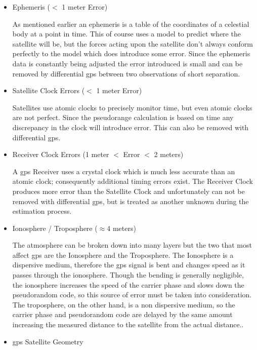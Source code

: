 \begin{itemize}
	\item Ephemeris ($<$ 1 meter Error)

As mentioned earlier an ephemeris is a table of the coordinates of a celestial body at a point in time. This of course uses a model to predict where the satellite will be, but the forces acting upon the satellite don't always conform perfectly to the model which does introduce some error.  Since the ephemeris data is constantly being adjusted the error introduced is small and can be removed by differential \ac{gps} between two observations of short separation.

	\item Satellite Clock Errors ($<$ 1 meter Error)

Satellites use atomic clocks to precisely monitor time, but even atomic clocks are not perfect.  Since the pseudorange calculation is based on time any discrepancy in the clock will introduce error.  This can also be removed with differential \ac{gps}.

	\item Receiver Clock Errors (1 meter $<$ Error $<$ 2 meters)

A \ac{gps} Receiver uses a crystal clock which is much less accurate than an atomic clock; consequently additional timing errors exist.  The Receiver Clock produces more error than the Satellite Clock and unfortunately can not be removed with differential \ac{gps}, but is treated as another unknown during the estimation process.

	\item Ionosphere / Troposphere ($\approx$4 meters)

The atmosphere can be broken down into many layers but the two that most affect \ac{gps} are the Ionosphere and the Troposphere.  The Ionosphere is a dispersive medium, therefore the \ac{gps} signal is bent and changes speed as it passes through the ionosphere. Though the bending is generally negligible, the ionosphere increases the speed of the carrier phase and slows down the pseudorandom code, so this source of error must be taken into consideration.  The troposphere, on the other hand, is a non dispersive medium, so the carrier phase and pseudorandom code are delayed by the same amount increasing the measured distance to the satellite from the actual distance.\cite[]{EL-RABBANY}.

 	\item \ac{gps} Satellite Geometry


\end{itemize}
